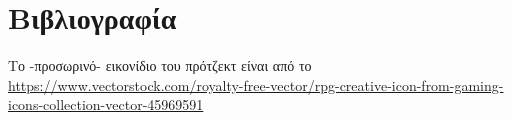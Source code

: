 \section{Βιβλιογραφία}
Το -προσωρινό- εικονίδιο του πρότζεκτ είναι από το \url{https://www.vectorstock.com/royalty-free-vector/rpg-creative-icon-from-gaming-icons-collection-vector-45969591}
